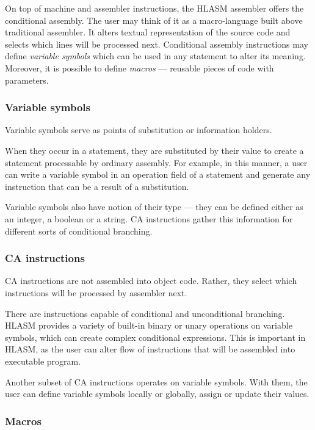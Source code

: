 On top of machine and assembler instructions, the HLASM assembler offers the conditional assembly. The user may think of it as a macro-language built above traditional assembler. It alters textual representation of the source code and selects which lines will be processed next. Conditional assembly instructions may define \emph{variable symbols} which can be used in any statement to alter its meaning. Moreover, it is possible to define \emph{macros} --- reusable pieces of code with parameters.

\subsubsection{Variable symbols}

Variable symbols serve as points of substitution or information holders. 

When they occur in a statement, they are substituted by their value to create a statement processable by ordinary assembly. For example, in this manner, a user can write a variable symbol in an operation field of a statement and generate any instruction that can be a result of a substitution.

Variable symbols also have notion of their type --- they can be defined either as an integer, a boolean or a string. CA instructions gather this information for different sorts of conditional branching.

\subsubsection{CA instructions}

CA instructions are not assembled into object code. Rather, they select which instructions will be processed by assembler next.

There are instructions capable of conditional and unconditional branching. HLASM provides a variety of built-in binary or unary operations on variable symbols, which can create complex conditional expressions. This is important in HLASM, as the user can alter flow of instructions that will be assembled into executable program.

Another subset of CA instructions operates on variable symbols. With them, the user can define variable symbols locally or globally, assign or update their values.

\subsubsection{Macros}

